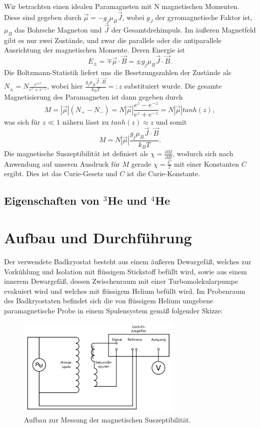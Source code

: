 \documentclass[bigchapter,colorback,accentcolor=tud4b,linedtoc,11pt]{tudreport}
\begin{document}
Wir betrachten einen idealen Paramagneten mit N magnetischen Momenten. Diese sind gegeben durch $\vec{\mu} = -g_j \mu_B \vec{J}$, wobei $g_J$ der gyromagnetische Faktor ist, $\mu_B$ das Bohrsche Magneton und $\vec{J}$ der Gesamtdrehimpuls. Im äußeren Magnetfeld gibt es nur zwei Zustände, und zwar die parallele oder die antiparallele Ausrichtung der magnetischen Momente. Deren Energie ist
$$E_{\pm} = \mp \vec{\mu} \cdot \vec{B} = \pm g_j \mu_B \vec{J} \cdot \vec{B}.$$
Die Boltzmann-Statistik liefert uns die Besetzungszahlen der Zustände als $N_{\pm} = N \frac{e^{\pm z}}{e^z + e^{-z}}$, wobei hier $\frac{g_j \mu_B \vec{J} \cdot \vec{B}}{k_B T} =: z$ substituiert wurde. Die gesamte Magnetisierung des Paramagneten ist dann gegeben durch 
$$M = |\vec{\mu}| (N_+ - N_-) = N |\vec{\mu}| \frac{e^z - e^{-z}}{e^z + e^{-z}} = N |\vec{\mu}| tanh(z) ,$$ was sich für $z \ll 1$ nähern lässt zu $tanh(z) \approx z$ und somit 
$$M = N |\vec{\mu}| \frac{g_j \mu_B \vec{J} \cdot \vec{B}}{k_B T}.$$
Die magnetische Suszeptibilität ist definiert als $\chi = \frac{\partial M}{\partial B}$, wodurch sich nach Anwendung auf unseren Ausdruck für $M$ gerade $\chi = \frac{C}{T}$ mit einer Konstanten $C$ ergibt. Dies ist das Curie-Gesetz und $C$ ist die Curie-Konstante.

\section{Eigenschaften von $^3$He und $^4$He}

\chapter{Aufbau und Durchführung}

Der verwendete Badkryostat besteht aus einem äußeren Dewargefäß, welches zur Vorkühlung und Isolation mit flüssigem Stickstoff befüllt wird, sowie aus einem innerem Dewargefäß, dessen Zwischenraum mit einer Turbomolekularpumpe evakuiert wird und welches mit flüssigem Helium befüllt wird. Im Probenraum des Badkryostaten befindet sich die von flüssigem Helium umgebene paramagnetische Probe in einem Spulensystem gemäß folgender Skizze: 

\begin{figure}[h] 
  \centering
     \includegraphics[width=0.7\textwidth]{data/Aufbau.jpg}
  \caption{Aufbau zur Messung der magnetischen Suszeptibilität. \cite{anleitung}}  
  \label{fig:Bild1}
\end{figure}
\end{document}

